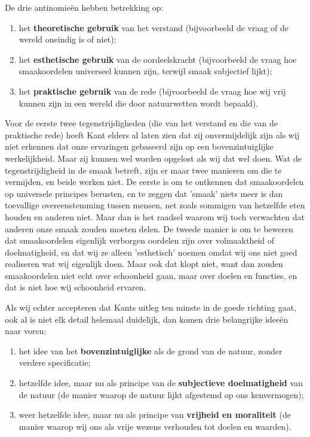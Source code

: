 \begin{mdframed}[leftmargin=0pt,rightmargin=0pt,backgroundcolor=blue!6,linecolor=white,innertopmargin=6pt,innerbottommargin=6pt]
De drie antinomieën hebben betrekking op:
\begin{enumerate}
    \item het \textbf{theoretische gebruik} van het verstand (bijvoorbeeld de vraag of de wereld oneindig is of niet);
    \item het \textbf{esthetische gebruik} van de oordeelskracht (bijvoorbeeld de vraag hoe smaakoordelen universeel kunnen zijn, terwijl smaak subjectief lijkt);
    \item het \textbf{praktische gebruik} van de rede (bijvoorbeeld de vraag hoe wij vrij kunnen zijn in een wereld die door natuurwetten wordt bepaald).
\end{enumerate}

Voor de eerste twee tegenstrijdigheden (die van het verstand en die van de praktische rede) heeft Kant elders al laten zien dat zij onvermijdelijk zijn als wij niet erkennen dat onze ervaringen gebaseerd zijn op een bovenzintuiglijke werkelijkheid. Maar zij kunnen wel worden opgelost als wij dat wel doen. Wat de tegenstrijdigheid in de smaak betreft, zijn er maar twee manieren om die te vermijden, en beide werken niet. De eerste is om te ontkennen dat smaakoordelen op universele principes berusten, en te zeggen dat 'smaak' niets meer is dan toevallige overeenstemming tussen mensen, net zoals sommigen van hetzelfde eten houden en anderen niet. Maar dan is het raadsel waarom wij toch verwachten dat anderen onze smaak zouden moeten delen. De tweede manier is om te beweren dat smaakoordelen eigenlijk verborgen oordelen zijn over volmaaktheid of doelmatigheid, en dat wij ze alleen 'esthetisch' noemen omdat wij ons niet goed realiseren wat wij eigenlijk doen. Maar ook dat klopt niet, want dan zouden smaakoordelen niet echt over schoonheid gaan, maar over doelen en functies, en dat is niet hoe wij schoonheid ervaren.

Als wij echter accepteren dat Kants uitleg ten minste in de goede richting gaat, ook al is niet elk detail helemaal duidelijk, dan komen drie belangrijke ideeën naar voren:
\begin{enumerate}
    \item het idee van het \textbf{bovenzintuiglijke} als de grond van de natuur, zonder verdere specificatie;
    \item hetzelfde idee, maar nu als principe van de \textbf{subjectieve doelmatigheid} van de natuur (de manier waarop de natuur lijkt afgestemd op ons kenvermogen);
    \item weer hetzelfde idee, maar nu als principe van \textbf{vrijheid en moraliteit} (de manier waarop wij ons als vrije wezens verhouden tot doelen en waarden).
\end{enumerate}


\end{mdframed}
